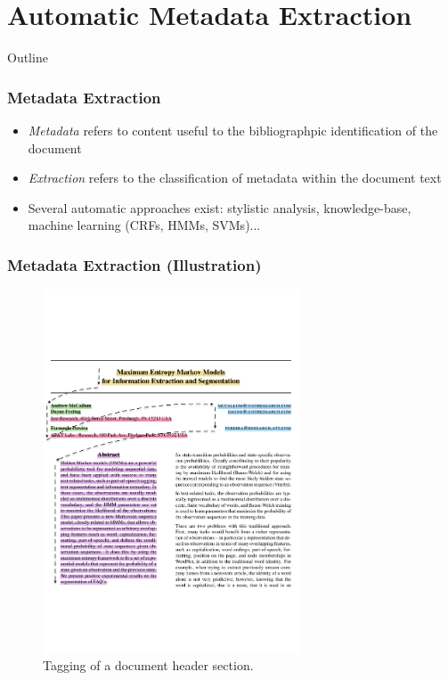 \documentclass{beamer}
\begin{document}
\section{Automatic Metadata Extraction}


\begin{frame}[noframenumbering]{Outline}
\end{frame}


\begin{frame}
\frametitle{Metadata Extraction}
\begin{itemize}
\item \emph{Metadata} refers to content useful to the bibliographpic identification of the document
\item \emph{Extraction} refers to the classification of metadata within the document text
\item Several automatic approaches exist: stylistic analysis, knowledge-base, machine learning (CRFs, HMMs, SVMs)...
\end{itemize}
\end{frame}


\begin{frame}
\frametitle{Metadata Extraction (Illustration)}
\begin{figure}[h]
\center
\includegraphics[width=3in]{Figures/extraction.pdf}
\caption{Tagging of a document header section.}
\end{figure}
\end{frame}
\end{document}

